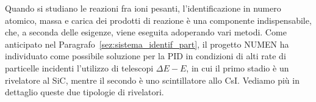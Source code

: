 

Quando si studiano le reazioni fra ioni pesanti, l'identificazione in numero atomico, massa e carica dei prodotti di reazione è una componente indispensabile, che, a seconda delle esigenze, viene eseguita adoperando vari metodi.
Come anticipato nel Paragrafo~\ref{sez:sistema_identif_part}, il progetto NUMEN ha individuato come possibile soluzione per la PID in condizioni di alti rate di particelle incidenti l'utilizzo di telescopi $\Delta E - E$, in cui il primo stadio è un rivelatore al SiC, mentre il secondo è uno scintillatore allo CsI.
Vediamo più in dettaglio queste due tipologie di rivelatori.














\subsection{}


